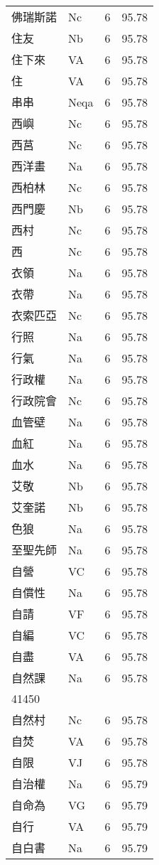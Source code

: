 \documentclass[twocolumn]{book}
\begin{document}
\begin{supertabular}{llrr}
佛瑞斯諾 & Nc & 6 &  95.78\\
住友 & Nb & 6 &  95.78\\
住下來 & VA & 6 &  95.78\\
住 & VA & 6 &  95.78\\
串串 & Neqa & 6 &  95.78\\
西嶼 & Nc & 6 &  95.78\\
西莒 & Nc & 6 &  95.78\\
西洋畫 & Na & 6 &  95.78\\
西柏林 & Nc & 6 &  95.78\\
西門慶 & Nb & 6 &  95.78\\
西村 & Nc & 6 &  95.78\\
西 & Nc & 6 &  95.78\\
衣領 & Na & 6 &  95.78\\
衣帶 & Na & 6 &  95.78\\
衣索匹亞 & Nc & 6 &  95.78\\
行照 & Na & 6 &  95.78\\
行氣 & Na & 6 &  95.78\\
行政權 & Na & 6 &  95.78\\
行政院會 & Nc & 6 &  95.78\\
血管壁 & Na & 6 &  95.78\\
血紅 & Na & 6 &  95.78\\
血水 & Na & 6 &  95.78\\
艾敬 & Nb & 6 &  95.78\\
艾奎諾 & Nb & 6 &  95.78\\
色狼 & Na & 6 &  95.78\\
至聖先師 & Na & 6 &  95.78\\
自營 & VC & 6 &  95.78\\
自償性 & Na & 6 &  95.78\\
自請 & VF & 6 &  95.78\\
自編 & VC & 6 &  95.78\\
自盡 & VA & 6 &  95.78\\
自然課 & Na & 6 &  95.78\\
41450\\
自然村 & Nc & 6 &  95.78\\
自焚 & VA & 6 &  95.78\\
自限 & VJ & 6 &  95.78\\
自治權 & Na & 6 &  95.79\\
自命為 & VG & 6 &  95.79\\
自行 & VA & 6 &  95.79\\
自白書 & Na & 6 &  95.79\\

\end{supertabular}
\end{document}
